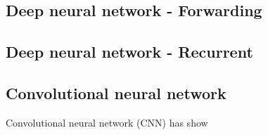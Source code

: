 \subsection{Deep neural network - Forwarding}
\subsection{Deep neural network - Recurrent}
\subsection{Convolutional neural network}
Convolutional neural network (CNN) has show